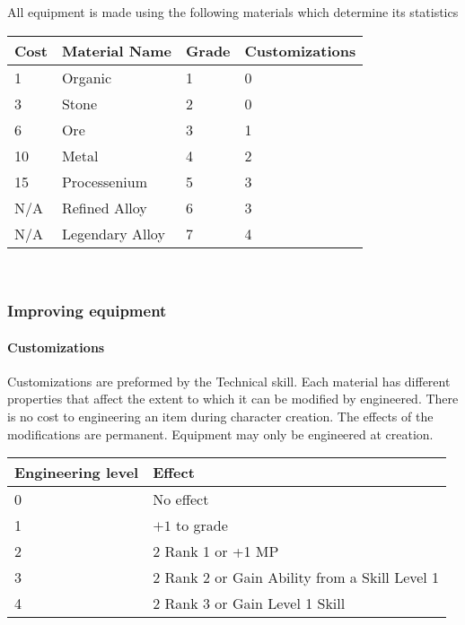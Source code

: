 All equipment is made using the following materials which determine its statistics
\begin{center}
\begin{tabularx}{\textwidth}{X X X X}
\hline
Cost& Material Name & Grade & Customizations \\
\hline
1 & Organic & 1 & 0\\
3& Stone & 2 & 0\\
6& Ore& 3& 1\\
10& Metal& 4& 2\\
15& Processenium& 5& 3\\
N/A& Refined Alloy& 6& 3\\
N/A& Legendary Alloy& 7& 4\\
\hline
\end{tabularx}\\
\end{center}


\subsubsection{Improving equipment}

\paragraph{Customizations}

Customizations are preformed by the Technical skill. Each material has
different properties that affect the extent to which it can be modified by
engineered. There is no cost to engineering an item during character creation.
The effects of the modifications are permanent. Equipment may only be
engineered at creation. \\ 

\begin{center} 
\begin{tabularx}{\textwidth}{X X} \hline Engineering level & Effect \\
\hline
0 & No effect \\
1 & $+1$ to grade \\
2 & 2 Rank 1 or +1 MP \\
3 & 2 Rank 2 or Gain Ability from a Skill Level 1\\
4 & 2 Rank 3 or Gain Level 1 Skill \\
\hline
\end{tabularx}\\
\end{center}

